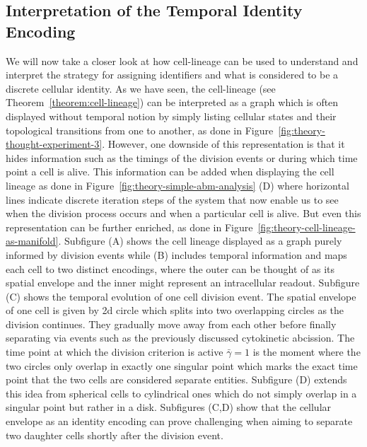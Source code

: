 \subsection{Interpretation of the Temporal Identity Encoding}
We will now take a closer look at how cell-lineage can be used to understand and interpret the
strategy for assigning identifiers and what is considered to be a discrete cellular identity.
As we have seen, the cell-lineage (see Theorem~\ref{theorem:cell-lineage}) can be interpreted as a
graph which is often displayed without temporal notion by simply listing cellular states and their
topological transitions from one to another, as done in
Figure~\ref{fig:theory-thought-experiment-3}.
However, one downside of this representation is that it hides information such as the timings of the
division events or during which time point a cell is alive.
This information can be added when displaying the cell lineage as done in
Figure~\ref{fig:theory-simple-abm-analysis} (D) where horizontal lines indicate discrete iteration
steps of the system that now enable us to see when the division process occurs and when a particular
cell is alive.
But even this representation can be further enriched, as done in
Figure~\ref{fig:theory-cell-lineage-as-manifold}.
Subfigure (A) shows the cell lineage displayed as a graph purely informed by division events while
(B) includes temporal information and maps each cell to two distinct encodings, where the outer can
be thought of as its spatial envelope and the inner might represent an intracellular readout.
Subfigure (C) shows the temporal evolution of one cell division event.
The spatial envelope of one cell is given by \ac{2d} circle which splits into two overlapping
circles as the division continues.
They gradually move away from each other before finally separating via events such as the previously
discussed cytokinetic abcission.
The time point at which the division criterion is active $\bar{\gamma}=1$ is the moment where the
two circles only overlap in exactly one singular point which marks the exact time point that the two
cells are considered separate entities.
Subfigure (D) extends this idea from spherical cells to cylindrical ones which do not simply overlap
in a singular point but rather in a disk.
Subfigures (C,D) show that the cellular envelope as an identity encoding can prove challenging when
aiming to separate two daughter cells shortly after the division event.

